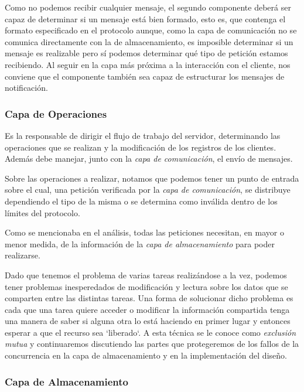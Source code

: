 \documentclass{replab}
\begin{document}
    Como no podemos recibir cualquier mensaje, el segundo componente
    deberá ser capaz de determinar si un mensaje está bien formado,
    esto es, que contenga el formato especificado en el protocolo
    aunque, como la capa de comunicación no se comunica directamente
    con la de almacenamiento, es imposible determinar si un mensaje es
    realizable pero sí podemos determinar qué tipo de petición estamos
    recibiendo. Al seguir en la capa más próxima a la interacción con
    el cliente, nos conviene que el componente también sea capaz de
    estructurar los mensajes de notificación.

    \subsubsection{Capa de Operaciones}
    
    Es la responsable de dirigir el flujo de trabajo del servidor,
    determinando las operaciones que se realizan y la modificación de
    los registros de los clientes. Además debe manejar, junto con la
    \textit{capa de comunicación}, el envío de mensajes.

    Sobre las operaciones a realizar, notamos que podemos tener un
    punto de entrada sobre el cual, una petición verificada por la
    \textit{capa de comunicación}, se distribuye dependiendo el tipo
    de la misma o se determina como inválida dentro de los límites del
    protocolo.

    Como se mencionaba en el análisis, todas las peticiones necesitan,
    en mayor o menor medida, de la información de la \textit{capa de
      almacenamiento} para poder realizarse.

    Dado que tenemos el problema de varias tareas realizándose a la
    vez, podemos tener problemas inesperedados de modificación y
    lectura sobre los datos que se comparten entre las distintas
    tareas. Una forma de solucionar dicho problema es cada que una
    tarea quiere acceder o modificar la información compartida tenga
    una manera de saber si alguna otra lo está haciendo en primer
    lugar y entonces esperar a que el recurso sea `liberado`. A esta
    técnica se le conoce como \textit{exclusión mutua} y continuaremos
    discutiendo las partes que protegeremos de los fallos de la
    concurrencia en la capa de almacenamiento y en la implementación
    del diseño. 
    
    \subsubsection{Capa de Almacenamiento}
    
\end{document}
